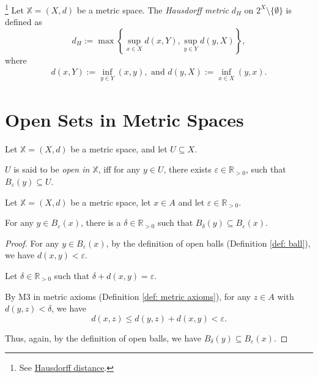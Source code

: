 \begin{example}
	\footnote{
		See \href{https://en.wikipedia.org/wiki/Hausdorff_distance}{Hausdorff distance}.
	}	
	Let $\mathbb X = (X, d)$ be a metric space. The \textit{Hausdorff metric} $d_H$ on $2^X \setminus \{\emptyset\}$ is defined as
	$$
	d_H := \max \left\{ \sup_{x \in X}d(x,Y), \sup_{y \in Y} d(y, X)\right\},
	$$
	where
	$$
	\begin{aligned}
		d(x,Y) := \inf_{y \in Y}(x,y), \text{ and } d(y, X) := \inf_{x \in X} (y, x).
	\end{aligned}
	$$
\end{example}


\section{Open Sets in Metric Spaces}


\begin{definition}
	\label{def: open set in metric space}
	Let $\mathbb X = (X, d)$ be a metric space, and let $U \subseteq X$.
	
	$U$ is said to be \textit{open in $\mathbb X$}, iff for any $y \in U$, there exists $\varepsilon \in \mathbb R_{> 0}$, such that $B_\varepsilon(y) \subseteq U$.
\end{definition}


\begin{lemma}
	\label{lm: open balls of point inside open ball}
	Let $\mathbb X = (X, d)$ be a metric space, let $x \in A$ and let $\varepsilon \in \mathbb R_{> 0}$.
	
	For any $y \in B_\varepsilon (x)$, there is a $\delta \in \mathbb R_{> 0}$ such that $B_\delta (y) \subseteq B_\varepsilon(x)$.
	
	\begin{proof}
		For any $y \in B_\varepsilon (x)$, by the definition of open balls (Definition \ref{def: ball}), we have $d(x,y) < \varepsilon$.
		
		Let $\delta \in \mathbb R_{> 0}$ such that $\delta + d(x,y) = \varepsilon$.
		
		By M3 in metric axioms (Definition \ref{def: metric axioms}), for any $z \in A$ with $d(y,z) < \delta$, we have
		$$
		d(x, z) \le d(y, z) + d(x, y) < \varepsilon.
		$$
		
		Thus, again, by the definition of open balls, we have $B_\delta(y) \subseteq B_\varepsilon(x)$.
		
		\qedlm
	\end{proof}
\end{lemma}


